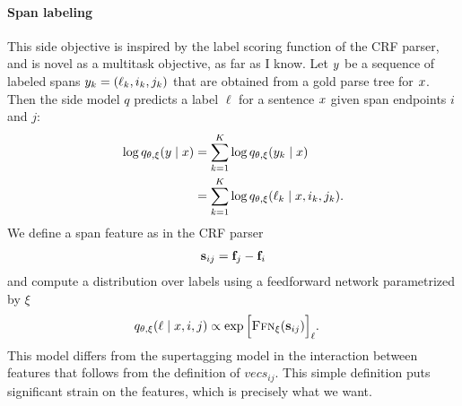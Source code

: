 \paragraph{Span labeling}
This side objective is inspired by the label scoring function of the CRF parser, and is novel as a multitask objective, as far as I know. Let $y$ be a sequence of labeled spans $y_k = (\ell_k, i_k, j_k)$ that are obtained from a gold parse tree for $x$. Then the side model $q$ predicts a label $\ell$ for a sentence $x$ given span endpoints $i$ and $j$:
\begin{align*}
  \log q_{\theta, \xi}(y \mid x)
    &= \sum_{k=1}^K \log q_{\theta, \xi}( y_k \mid x)  \\
    &= \sum_{k=1}^K \log q_{\theta, \xi}( \ell_k \mid x, i_k, j_k).
\end{align*}
We define a span feature as in the CRF parser
\begin{align*}
  \mathbf{s}_{ij} = \mathbf{f}_j - \mathbf{f}_i
\end{align*}
and compute a distribution over labels using a feedforward network parametrized by $\xi$
\begin{align*}
  q_{\theta, \xi}( \ell \mid x, i, j) &\propto \exp \Big[ \textsc{Ffn}_{\xi}( \mathbf{s}_{ij} ) \Big]_{\ell}.
\end{align*}
This model differs from the supertagging model in the interaction between features that follows from the definition of $vecs_{ij}$. This simple definition puts significant strain on the features, which is precisely what we want.



